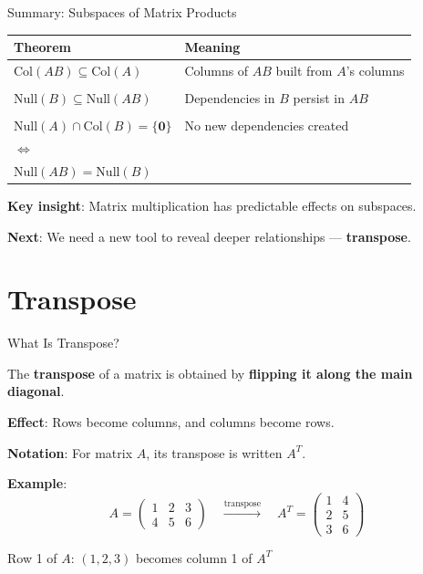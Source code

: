 \documentclass[10pt]{beamer}
\theoremstyle{definition}
\newcommand{\x}[1]{\alert{\textbf{#1}}}
\begin{document}
\begin{frame}{Summary: Subspaces of Matrix Products}

\begin{center}
\begin{tabular}{|l|l|}
\hline
\textbf{Theorem} & \textbf{Meaning} \\
\hline
$\text{Col}(AB) \subseteq \text{Col}(A)$ & Columns of $AB$ built from $A$'s columns \\
& \\
$\text{Null}(B) \subseteq \text{Null}(AB)$ & Dependencies in $B$ persist in $AB$ \\
& \\
$\text{Null}(A) \cap \text{Col}(B) = \{\mathbf{0}\}$ & No new dependencies created \\
$\Leftrightarrow$ & \\
$\text{Null}(AB) = \text{Null}(B)$ & \\
\hline
\end{tabular}
\end{center}

\vspace{1em}

\x{Key insight}: Matrix multiplication has predictable effects on subspaces.

\vspace{0.5em}

\x{Next}: We need a new tool to reveal deeper relationships — \x{transpose}.

\end{frame}

\section{Transpose}

\begin{frame}{What Is Transpose?}

The \x{transpose} of a matrix is obtained by \x{flipping it along the main diagonal}.

\vspace{1em}

\x{Effect}: Rows become columns, and columns become rows.

\vspace{1em}

\x{Notation}: For matrix $A$, its transpose is written $A^T$.

\vspace{1em}

\x{Example}:
$$A = \begin{pmatrix} 1 & 2 & 3 \\ 4 & 5 & 6 \end{pmatrix} \quad \xrightarrow{\text{transpose}} \quad A^T = \begin{pmatrix} 1 & 4 \\ 2 & 5 \\ 3 & 6 \end{pmatrix}$$

Row 1 of $A$: $(1, 2, 3)$ becomes column 1 of $A^T$

\end{frame}
\end{document}
